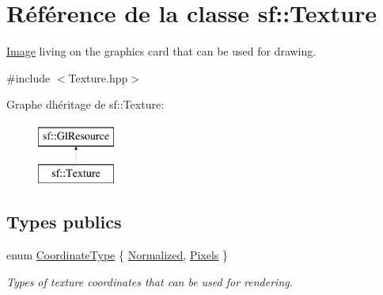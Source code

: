 \hypertarget{classsf_1_1Texture}{}\section{Référence de la classe sf\+:\+:Texture}
\label{classsf_1_1Texture}


\hyperlink{classsf_1_1Image}{Image} living on the graphics card that can be used for drawing.  




{\ttfamily \#include $<$Texture.\+hpp$>$}

Graphe d\textquotesingle{}héritage de sf\+:\+:Texture\+:\begin{figure}[H]
\begin{center}
\leavevmode
\includegraphics[height=2.000000cm]{classsf_1_1Texture}
\end{center}
\end{figure}
\subsection*{Types publics}
\begin{DoxyCompactItemize}
\item 
enum \hyperlink{classsf_1_1Texture_aa6fd3bbe3c334b3c4428edfb2765a82e}{Coordinate\+Type} \{ \hyperlink{classsf_1_1Texture_aa6fd3bbe3c334b3c4428edfb2765a82ea69d6228950882e4d68be4ba4dbe7df73}{Normalized}, 
\hyperlink{classsf_1_1Texture_aa6fd3bbe3c334b3c4428edfb2765a82ea6372f9c3a10203a7a69d8d5da59d82ff}{Pixels}
 \}\begin{DoxyCompactList}\small\item\em Types of texture coordinates that can be used for rendering. \end{DoxyCompactList}
\end{DoxyCompactItemize}
